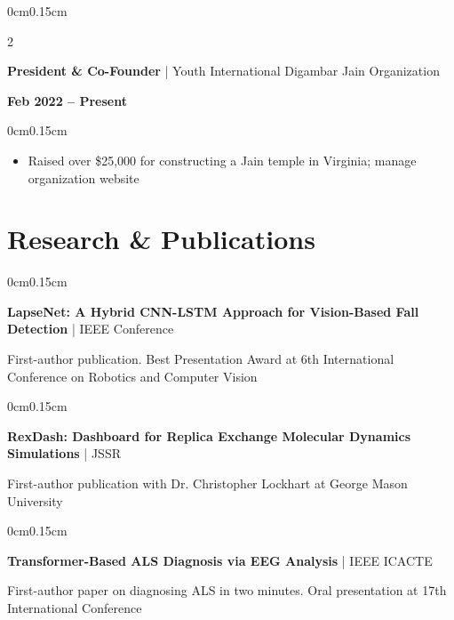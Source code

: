 \documentclass[10pt, letterpaper]{article}
\newenvironment{highlights}{
    \begin{itemize}[topsep=0pt, parsep=0pt, partopsep=0pt, itemsep=0pt, leftmargin=0.6cm]
}{
    \end{itemize}
}
\newenvironment{onecolentry}{
    \begin{adjustwidth}{0cm}{0.15cm}
}{
    \end{adjustwidth}
}
\newenvironment{twocolentry}[2][]{
    \onecolentry
    \def\secondColumn{#2}
    \setcolumnwidth{\fill, 4cm}
    \begin{paracol}{2}
}{
    \switchcolumn \raggedleft \secondColumn
    \end{paracol}
    \endonecolentry
}
\begin{document}
    \vspace{0.05cm}

    \begin{twocolentry}{\textbf{Feb 2022 -- Present}}
        \textbf{President \& Co-Founder} | Youth International Digambar Jain Organization
    \end{twocolentry}

    \begin{onecolentry}
        \begin{highlights}
            \item Raised over \$25,000 for constructing a Jain temple in Virginia; manage organization website
        \end{highlights}
    \end{onecolentry}

    \vspace{0.05cm}
    \section{Research \& Publications}
    \vspace{0.05cm}

    \begin{onecolentry}
        \textbf{LapseNet: A Hybrid CNN-LSTM Approach for Vision-Based Fall Detection} | IEEE Conference
        
        \vspace{0.05cm}
        First-author publication. Best Presentation Award at 6th International Conference on Robotics and Computer Vision
    \end{onecolentry}

    \vspace{0.1cm}

    \begin{onecolentry}
        \textbf{RexDash: Dashboard for Replica Exchange Molecular Dynamics Simulations} | JSSR
        
        \vspace{0.05cm}
        First-author publication with Dr. Christopher Lockhart at George Mason University
    \end{onecolentry}

    \vspace{0.1cm}

    \begin{onecolentry}
        \textbf{Transformer-Based ALS Diagnosis via EEG Analysis} | IEEE ICACTE
        
        \vspace{0.05cm}
        First-author paper on diagnosing ALS in two minutes. Oral presentation at 17th International Conference
    \end{onecolentry}
\end{document}
